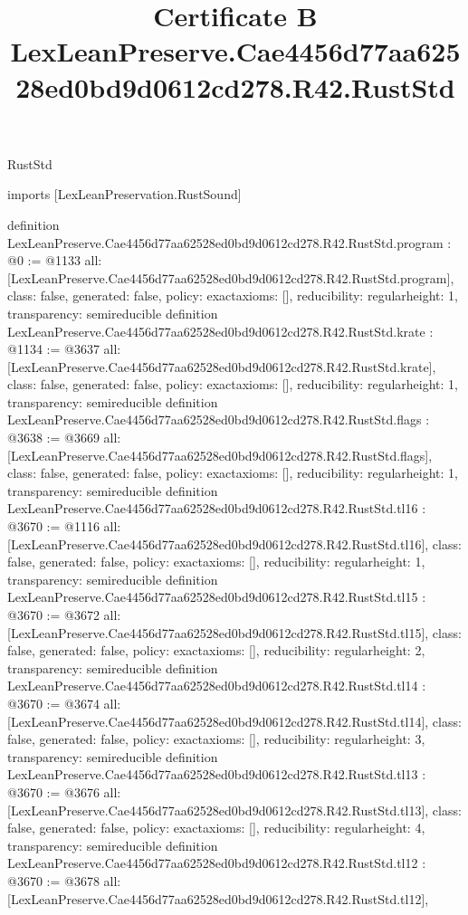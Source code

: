 \begin{lexlean}{RustStd}
\title{Certificate B LexLeanPreserve.Cae4456d77aa62528ed0bd9d0612cd278.R42.RustStd}
\begin{coremodule}
imports [LexLeanPreservation.RustSound]

definition LexLeanPreserve.Cae4456d77aa62528ed0bd9d0612cd278.R42.RustStd.program : @0 := @1133 {
  all: [LexLeanPreserve.Cae4456d77aa62528ed0bd9d0612cd278.R42.RustStd.program],
  class: false,
  generated: false,
  policy: exact{axioms: []},
  reducibility: regular{height: 1},
  transparency: semireducible
}
definition LexLeanPreserve.Cae4456d77aa62528ed0bd9d0612cd278.R42.RustStd.krate : @1134 := @3637 {
  all: [LexLeanPreserve.Cae4456d77aa62528ed0bd9d0612cd278.R42.RustStd.krate],
  class: false,
  generated: false,
  policy: exact{axioms: []},
  reducibility: regular{height: 1},
  transparency: semireducible
}
definition LexLeanPreserve.Cae4456d77aa62528ed0bd9d0612cd278.R42.RustStd.flags : @3638 := @3669 {
  all: [LexLeanPreserve.Cae4456d77aa62528ed0bd9d0612cd278.R42.RustStd.flags],
  class: false,
  generated: false,
  policy: exact{axioms: []},
  reducibility: regular{height: 1},
  transparency: semireducible
}
definition LexLeanPreserve.Cae4456d77aa62528ed0bd9d0612cd278.R42.RustStd.tl16 : @3670 := @1116 {
  all: [LexLeanPreserve.Cae4456d77aa62528ed0bd9d0612cd278.R42.RustStd.tl16],
  class: false,
  generated: false,
  policy: exact{axioms: []},
  reducibility: regular{height: 1},
  transparency: semireducible
}
definition LexLeanPreserve.Cae4456d77aa62528ed0bd9d0612cd278.R42.RustStd.tl15 : @3670 := @3672 {
  all: [LexLeanPreserve.Cae4456d77aa62528ed0bd9d0612cd278.R42.RustStd.tl15],
  class: false,
  generated: false,
  policy: exact{axioms: []},
  reducibility: regular{height: 2},
  transparency: semireducible
}
definition LexLeanPreserve.Cae4456d77aa62528ed0bd9d0612cd278.R42.RustStd.tl14 : @3670 := @3674 {
  all: [LexLeanPreserve.Cae4456d77aa62528ed0bd9d0612cd278.R42.RustStd.tl14],
  class: false,
  generated: false,
  policy: exact{axioms: []},
  reducibility: regular{height: 3},
  transparency: semireducible
}
definition LexLeanPreserve.Cae4456d77aa62528ed0bd9d0612cd278.R42.RustStd.tl13 : @3670 := @3676 {
  all: [LexLeanPreserve.Cae4456d77aa62528ed0bd9d0612cd278.R42.RustStd.tl13],
  class: false,
  generated: false,
  policy: exact{axioms: []},
  reducibility: regular{height: 4},
  transparency: semireducible
}
definition LexLeanPreserve.Cae4456d77aa62528ed0bd9d0612cd278.R42.RustStd.tl12 : @3670 := @3678 {
  all: [LexLeanPreserve.Cae4456d77aa62528ed0bd9d0612cd278.R42.RustStd.tl12],
}
\end{coremodule}
\end{lexlean}
